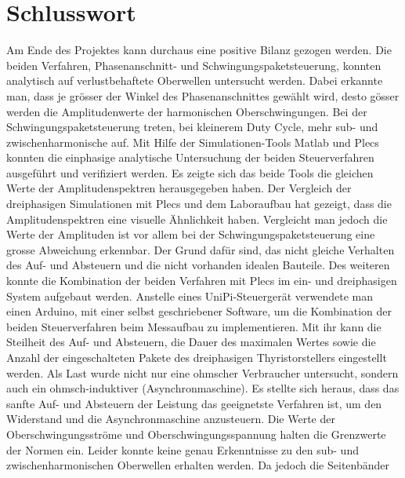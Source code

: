 \section{Schlusswort}

Am Ende des Projektes kann durchaus eine positive Bilanz gezogen werden. Die beiden Verfahren, Phasenanschnitt- und Schwingungspaketsteuerung, konnten analytisch auf verlustbehaftete Oberwellen untersucht werden. Dabei erkannte man, dass je grösser der Winkel des Phasenanschnittes gewählt wird, desto gösser werden die Amplitudenwerte der harmonischen Oberschwingungen. Bei der Schwingungspaketsteuerung treten, bei kleinerem Duty Cycle, mehr sub- und zwischenharmonische auf. Mit Hilfe der Simulationen-Tools Matlab und Plecs konnten die einphasige analytische Untersuchung der beiden Steuerverfahren ausgeführt und verifiziert werden. Es zeigte sich das beide Tools die gleichen Werte der Amplitudenspektren herausgegeben haben. Der Vergleich der dreiphasigen Simulationen mit Plecs und dem Laboraufbau hat gezeigt, dass die Amplitudenspektren eine visuelle Ähnlichkeit haben. Vergleicht man jedoch die Werte der Amplituden ist vor allem bei der Schwingungspaketsteuerung eine grosse Abweichung erkennbar. Der Grund dafür sind, das nicht gleiche Verhalten des Auf- und Absteuern und die nicht vorhanden idealen Bauteile. Des weiteren konnte die Kombination der beiden Verfahren mit Plecs im ein- und dreiphasigen System aufgebaut werden. Anstelle eines UniPi-Steuergerät verwendete man einen Arduino, mit einer selbst geschriebener Software, um die Kombination der beiden Steuerverfahren beim Messaufbau zu implementieren. Mit ihr kann die Steilheit des Auf- und Absteuern, die Dauer des maximalen Wertes sowie die Anzahl der eingeschalteten Pakete des dreiphasigen Thyristorstellers eingestellt werden. Als Last wurde nicht nur eine ohmscher Verbraucher untersucht, sondern auch ein ohmsch-induktiver (Asynchronmaschine). Es stellte sich heraus, dass das sanfte Auf- und Absteuern der Leistung das geeignetste Verfahren ist, um den Widerstand und die Asynchronmaschine anzusteuern. Die Werte der Oberschwingungsströme und Oberschwingungsspannung halten die Grenzwerte der Normen ein. Leider konnte keine genau Erkenntnisse zu den sub- und zwischenharmonischen Oberwellen erhalten werden. Da jedoch die Seitenbänder    





